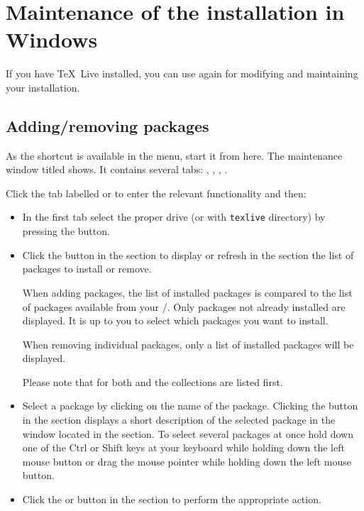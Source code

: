 \documentclass{article}
\begin{document}
\section{Maintenance of the installation in Windows}

If you have \TeX\ Live installed, you can use  again
for modifying and maintaining your installation.

\subsection{Adding/removing packages}

As the  shortcut is available in the  menu, start it from here. The maintenance window
titled  shows. It
contains several tabs: , , 
, .

Click the tab labelled  or  
to enter the relevant functionality and then:

\begin{itemize}
\item In the first tab select the proper \CD{} drive (or \DVD with
  \texttt{texlive} directory) by pressing the  button.
\item Click the  button in the  section to 
display or refresh in the  section the 
list of packages to install or remove.

When adding packages, the list of installed packages is compared to the list
of packages available from your \CD/\DVD. Only packages not already installed are
displayed. It is up to you to select which packages you want to
install. 

When removing individual packages, only a list of installed packages
will be displayed.

Please note that for both  and 
the collections are listed first.

\item Select a package by clicking on the name of the package. Clicking the
 button in the  section displays a short
description of the selected package in the window located in the  section. To select several packages at once hold
down one of the Ctrl or Shift keys at your keyboard while holding down the
left mouse button or drag the mouse pointer while holding down the left mouse
button.

\item Click the  or  button in the
 section to perform the appropriate action.
\end{itemize}
\end{document}
